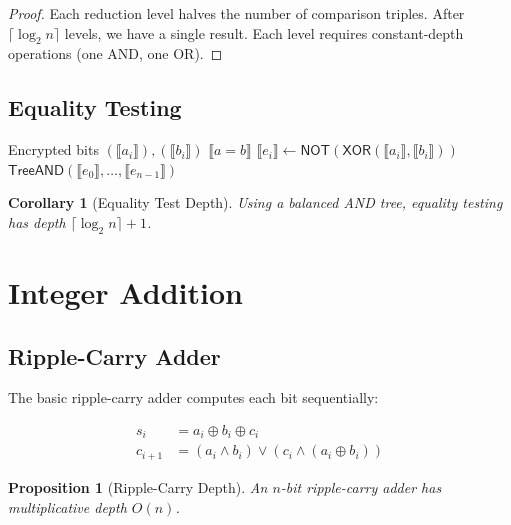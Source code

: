 \documentclass[11pt,a4paper]{article}
\newtheorem{proposition}[theorem]{Proposition}
\newtheorem{corollary}[theorem]{Corollary}
\begin{document}
\begin{proof}
Each reduction level halves the number of comparison triples. After $\lceil \log_2 n \rceil$ levels, we have a single result. Each level requires constant-depth operations (one AND, one OR).
\end{proof}

\subsection{Equality Testing}

\begin{algorithm}
\caption{Homomorphic Equality Test}
\begin{algorithmic}[1]
\Require Encrypted bits $(\llbracket a_i \rrbracket), (\llbracket b_i \rrbracket)$
\Ensure $\llbracket a = b \rrbracket$
    \State $\llbracket e_i \rrbracket \gets \textsf{NOT}(\textsf{XOR}(\llbracket a_i \rrbracket, \llbracket b_i \rrbracket))$
\EndFor
\State \Return $\textsf{TreeAND}(\llbracket e_0 \rrbracket, \ldots, \llbracket e_{n-1} \rrbracket)$
\end{algorithmic}
\end{algorithm}

\begin{corollary}[Equality Test Depth]
Using a balanced AND tree, equality testing has depth $\lceil \log_2 n \rceil + 1$.
\end{corollary}

\section{Integer Addition}

\subsection{Ripple-Carry Adder}

The basic ripple-carry adder computes each bit sequentially:

\begin{align}
s_i &= a_i \oplus b_i \oplus c_i \\
c_{i+1} &= (a_i \land b_i) \lor (c_i \land (a_i \oplus b_i))
\end{align}

\begin{proposition}[Ripple-Carry Depth]
An $n$-bit ripple-carry adder has multiplicative depth $O(n)$.
\end{proposition}
\end{document}
